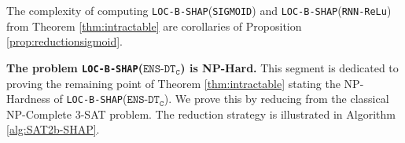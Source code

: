 The complexity of computing \texttt{LOC-B-SHAP}(\texttt{SIGMOID}) and \texttt{LOC-B-SHAP}(\texttt{RNN-ReLu}) from Theorem \ref{thm:intractable} are corollaries of Proposition \ref{prop:reductionsigmoid}.



\textbf{The problem \texttt{LOC-B-SHAP}($\texttt{ENS-DT}_{\texttt{C}}$) is NP-Hard.} 
This segment is dedicated to proving the remaining point of Theorem \ref{thm:intractable} stating the NP-Hardness of \texttt{LOC-B-SHAP}($\texttt{ENS-DT}_{\texttt{C}}$). We prove this by reducing from the classical NP-Complete 3-SAT problem. The reduction strategy is illustrated in Algorithm \ref{alg:SAT2b-SHAP}.

